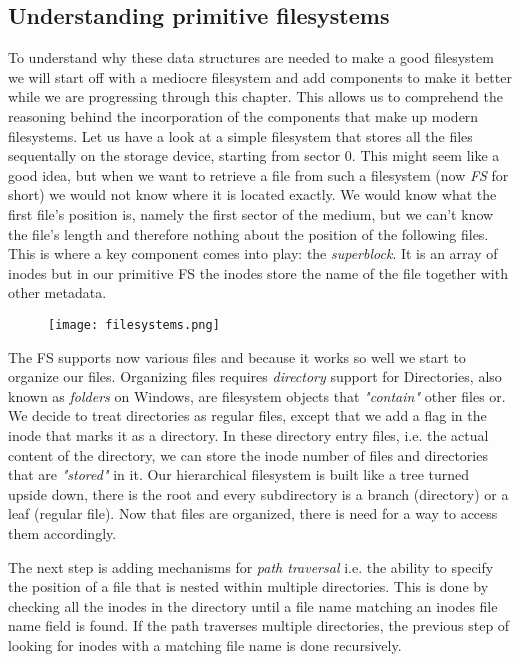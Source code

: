 \subsection{Understanding primitive filesystems}

To understand why these data structures are needed to make a good filesystem we will start off with a
mediocre filesystem and add components to make it better while we are progressing through this chapter. 
This allows us to comprehend the reasoning behind the incorporation of the components that make up modern filesystems.
Let us have a look at a simple filesystem that stores all the files sequentally on the storage device,
starting from sector 0. This might seem like a good idea, but when we want to retrieve a file from
such a filesystem (now \textit{FS} for short) we would not know where it is located exactly. We would know
what the first file's position is, namely the first sector of the medium, but we can't know the file's
length and therefore nothing about the position of the following files. This is where a key component
comes into play: the \textit{superblock}. It is an array of inodes but in our primitive FS the inodes store the name of
the file together with other metadata.

\begin{figure}[h]
	\texttt{[image: filesystems.png]}
	\centering
\end{figure}

The FS supports now various files and
because it works so well we start to organize our files. Organizing files requires \textit{directory}
support for Directories, also known as \textit{folders} on Windows, are filesystem objects that
\textit{"contain"} other files or. We decide to treat directories as regular files, except that we
add a flag in the inode that marks it as a directory. In these directory entry files, i.e. the actual
content of the directory, we can store the inode number of files and directories that are \textit{"stored"}
in it. Our hierarchical filesystem is built like a tree turned upside down, there is the root and every
subdirectory is a branch (directory) or a leaf (regular file). Now that files are organized, there is need
for a way to access them accordingly.

The next step is adding mechanisms for \textit{path traversal} i.e. the
ability to specify the position of a file that is nested within multiple directories. This is done by
checking all the inodes in the directory until a file name matching an inodes file name field is
found. If the path traverses multiple directories, the previous step of looking for inodes with a
matching file name is done recursively.


